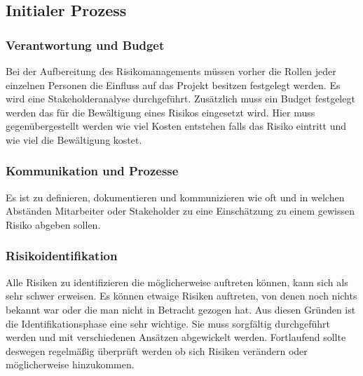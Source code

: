 \subsection{Initialer Prozess}
\subsubsection{Verantwortung und Budget}
Bei der Aufbereitung des Risikomanagements müssen vorher die Rollen jeder einzelnen Personen die Einfluss auf das Projekt besitzen festgelegt werden. Es wird eine Stakeholderanalyse durchgeführt.
Zusätzlich muss ein Budget festgelegt werden das für die Bewältigung eines Risikos eingesetzt wird. Hier muss gegenübergestellt werden wie viel Kosten entstehen falls das Risiko eintritt und wie viel die Bewältigung kostet.

\subsubsection{Kommunikation und Prozesse}
Es ist zu definieren, dokumentieren und kommunizieren wie oft und in welchen Abständen Mitarbeiter oder Stakeholder zu eine Einschätzung zu einem gewissen Risiko abgeben sollen. 


\subsubsection{Risikoidentifikation}
Alle Risiken zu identifizieren die möglicherweise auftreten können, kann sich als sehr schwer erweisen. Es können etwaige Risiken auftreten, von denen noch nichts bekannt war oder die man nicht in Betracht gezogen hat. Aus diesen Gründen ist die Identifikationsphase eine sehr wichtige. Sie muss sorgfältig durchgeführt werden und mit verschiedenen Ansätzen abgewickelt werden. Fortlaufend sollte deswegen regelmäßig überprüft werden ob sich Risiken verändern oder möglicherweise hinzukommen.
\\

